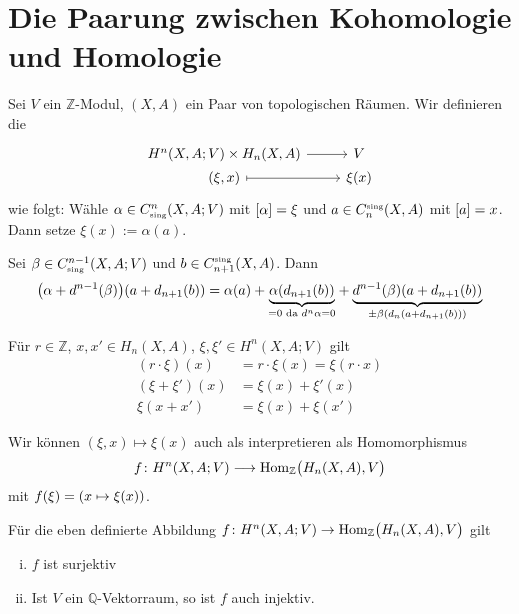 \section{Die Paarung zwischen Kohomologie und Homologie} %
\label{sec:2}

\begin{definition}[{name=[Paarung]}]
	Sei $V$ ein $\mathds{Z}$-Modul, $(X,A)$ ein Paar von topologischen Räumen. Wir definieren die 
	\[
		\begin{tikzcd}[row sep=0cm]
			H^n(X,A;V) \times H_n(X,A) \rar & V \\
			(\xi, x) \rar[mapsto] & \xi(x)
		\end{tikzcd}
	\]
	wie folgt: Wähle $\alpha \in C^n_\sing(X,A;V)$ mit $\benbrace*{\alpha}=\xi$ und $a \in C^\sing_n(X,A)$ mit $\benbrace*{a}=x$. Dann setze $\xi(x) := \alpha(a)$.
\end{definition}

\begin{bemerkung}
	Sei $\beta \in C^{n-1}_\sing(X,A;V)$ und $b \in C^\sing_{n+1}(X,A)$. Dann 
	\begin{align}
		\enbrace*{\alpha + d^{n-1}(\beta)}(a + d_{n+1}(b)) = \alpha(a) + \Underbrace{\alpha \enbrace*{d_{n+1}(b)}}{=0 \text{ da } d^n \alpha=0 } + \Underbrace{d^{n-1}(\beta) \enbrace*{a + d_{n+1}(b)}}{\pm \beta \enbrace*{d_n(a + d_{n+1}(b))}} 
	\end{align}
\end{bemerkung}

\begin{bemerkung}
	Für $r \in \mathds{Z}$, $x,x' \in H_n(X,A)$, $\xi,\xi' \in H^n(X,A;V)$ gilt
	\begin{align}
		(r \cdot \xi)(x) &= r \cdot \xi(x) = \xi(r \cdot x) \\
		(\xi +\xi')(x) &= \xi(x) + \xi'(x) \\
		\xi(x+x')&= \xi(x) + \xi(x')
	\end{align}
\end{bemerkung}

\begin{bemerkung}
	Wir können $(\xi,x)\mapsto \xi(x)$ auch als interpretieren als Homomorphismus
	\[
		f \colon H^n(X,A;V) \longrightarrow \Hom_\mathds{Z} \enbrace[\big]{H_n(X,A),V}
	\]
	mit $f(\xi)= \enbrace*{x \mapsto \xi(x)}$.
\end{bemerkung}

\begin{satz}
	Für die eben definierte Abbildung $f \colon H^n(X,A;V) \to \Hom_\mathds{Z} \enbrace[\big]{H_n(X,A),V}$ gilt
	\begin{enumerate}[(i)]
		\item $f$ ist surjektiv
		\item Ist $V$ ein $\mathds{Q}$-Vektorraum, so ist $f$ auch injektiv.
	\end{enumerate}
\end{satz}


